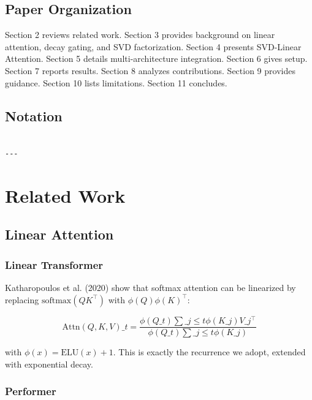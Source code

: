 \subsection{Paper Organization}

Section 2 reviews related work. Section 3 provides background on linear 
attention, decay gating, and SVD factorization. Section 4 presents 
SVD-Linear Attention. Section 5 details multi-architecture integration. 
Section 6 gives setup. Section 7 reports results. Section 8 analyzes 
contributions. Section 9 provides guidance. Section 10 lists limitations. 
Section 11 concludes.



\subsection{Notation}

\begin{lstlisting}

---
\end{lstlisting}


\section{Related Work}

\subsection{Linear Attention}

\subsubsection{Linear Transformer}

Katharopoulos et al. (2020) show that softmax attention can be linearized 
by replacing $\text{softmax}(Q K^\top)$ with $\phi(Q) \phi(K)^\top$:

\[
\text{Attn}(Q, K, V)\_t = \frac{\phi(Q\_t) \sum\_{j \leq t} \phi(K\_j) V\_j^\top}{\phi(Q\_t) \sum\_{j \leq t} \phi(K\_j)}
\tag{2.1}
\]

with $\phi(x) = \text{ELU}(x) + 1$. This is exactly the recurrence we adopt, 
extended with exponential decay.

\subsubsection{Performer}

